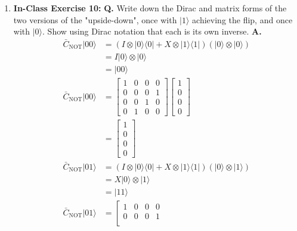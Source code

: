 \documentclass[main.tex]{subfiles}
\begin{document}
\begin{enumerate}
\item[] \textbf{In-Class Exercise 10:} \textbf{Q.} Write down the Dirac and matrix forms of the two versions of the "upside-down", once with $|1\rangle$ achieving the flip, and once with $|0\rangle$. Show using Dirac notation that each is its own inverse. \textbf{A.}
    \begin{align*}
        \bar{C}_{\text{NOT}}|00\rangle & = (I \otimes |0\rangle \langle 0|  + X \otimes | 1\rangle\langle 1|)
                                        (|0\rangle\otimes|0\rangle) \tag{Dirac control bit $|0\rangle$}\\
                                        & = I|0\rangle \otimes |0\rangle \\
                                        & = |00\rangle \\
        \bar{C}_{\text{NOT}}|00\rangle & = \left[\begin{array}{llll}1 & 0 & 0 & 0 \\0 & 0 & 0 & 1 \\
                                        0 & 0 & 1 & 0 \\0 & 1 & 0 & 0\end{array}\right]
                                        \left[\begin{array}{l}1\\0\\0\\0\end{array}\right]
                                        \tag{matrix control bit $|0\rangle$}\\
                                        & = \left[\begin{array}{l}1\\0\\0\\0\end{array}\right]\\
        \bar{C}_{\text{NOT}}|01\rangle & = (I \otimes |0\rangle\langle 0|  + X \otimes | 1\rangle\langle 1|)
                                        (|0\rangle \otimes |1\rangle) 
                                        \tag{Dirac control bit $|1\rangle$}\\
                                        & = X|0\rangle \otimes |1\rangle\\
                                        & = |11\rangle\\
        \bar{C}_{\text{NOT}}|01\rangle & = \left[\begin{array}{llll}1 & 0 & 0 & 0 \\0 & 0 & 0 & 1 \\

\end{array}
\end{align*}
\end{enumerate}
\end{document}
